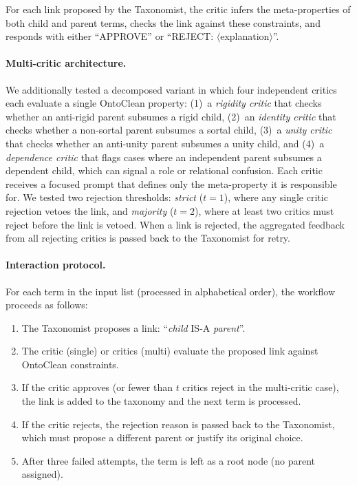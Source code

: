 \documentclass{IOS-Book-Article}
\begin{document}
For each link proposed by the Taxonomist, the critic infers the
meta-properties of both child and parent terms, checks the link
against these constraints, and responds with either ``APPROVE'' or
``REJECT: $\langle$explanation$\rangle$''.

\paragraph{Multi-critic architecture.}
We additionally tested a decomposed variant in which four independent
critics each evaluate a single OntoClean property:
(1)~a \emph{rigidity critic} that checks whether an anti-rigid parent
subsumes a rigid child,
(2)~an \emph{identity critic} that checks whether a non-sortal parent
subsumes a sortal child,
(3)~a \emph{unity critic} that checks whether an anti-unity parent
subsumes a unity child, and
(4)~a \emph{dependence critic} that flags cases where an independent
parent subsumes a dependent child, which can signal a role or
relational confusion.
Each critic receives a focused prompt that defines only the
meta-property it is responsible for.  We tested two rejection
thresholds: \emph{strict} ($t{=}1$), where any single critic rejection
vetoes the link, and \emph{majority} ($t{=}2$), where at least two
critics must reject before the link is vetoed.  When a link is
rejected, the aggregated feedback from all rejecting critics is passed
back to the Taxonomist for retry.

\paragraph{Interaction protocol.}
For each term in the input list (processed in alphabetical order), the
workflow proceeds as follows:

\begin{enumerate}
\item The Taxonomist proposes a link: ``\textit{child} IS-A
  \textit{parent}''.
\item The critic (single) or critics (multi) evaluate the proposed
  link against OntoClean constraints.
\item If the critic approves (or fewer than $t$ critics reject in the
  multi-critic case), the link is added to the taxonomy and the next
  term is processed.
\item If the critic rejects, the rejection reason is passed back to
  the Taxonomist, which must propose a different parent or justify its
  original choice.
\item After three failed attempts, the term is left as a root node
  (no parent assigned).
\end{enumerate}
\end{document}
